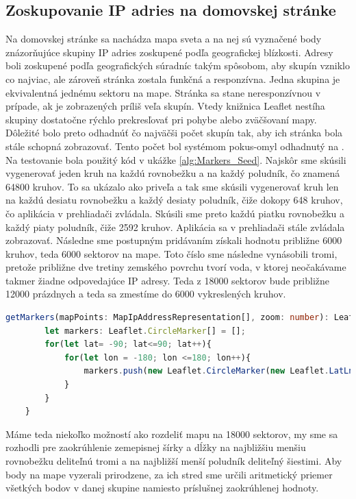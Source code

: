 \subsection{Zoskupovanie IP adries na domovskej stránke}
Na domovskej stránke sa nachádza mapa sveta a na nej sú vyznačené body znázorňujúce skupiny IP adries zoskupené podľa geografickej blízkosti. 
Adresy boli zoskupené podľa geografických súradníc takým spôsobom, aby skupín vzniklo co najviac, ale zároveň stránka zostala funkčná a responzívna. 
Jedna skupina je ekvivalentná jednému sektoru na mape.
Stránka sa stane neresponzívnou v prípade, ak je zobrazených príliš veľa skupín. Vtedy knižnica Leaflet nestíha skupiny dostatočne rýchlo prekresľovať pri 
pohybe alebo zväčšovaní mapy. Dôležité bolo preto odhadnúť čo najväčši počet skupín tak, aby ich stránka bola stále schopná zobrazovať. Tento počet bol 
systémom pokus-omyl odhadnutý na  . Na testovanie bola použitý kód v ukážke \ref{alg:Markers_Seed}. Najskôr sme skúsili vygenerovať jeden kruh na každú rovnobežku 
a na každý poludník, čo znamená 64800 kruhov. To sa ukázalo ako priveľa a tak sme skúsili vygenerovať kruh len na každú desiatu rovnobežku a každý desiaty poludník, 
čiže dokopy 648 kruhov, čo aplikácia v prehliadači zvládala. Skúsili sme preto každú piatku rovnobežku a každý piaty poludník, čiže 2592 kruhov. Aplikácia sa
v prehliadači stále zvládala zobrazovať. Následne sme postupným pridávaním získali hodnotu približne 6000 kruhov, teda 6000 sektorov na mape. Toto číslo sme 
následne vynásobili tromi, pretože približne dve tretiny zemského povrchu tvorí voda, v ktorej neočakávame takmer žiadne odpovedajúce IP adresy. Teda z 18000 
sektorov bude približne 12000 prázdnych a teda sa zmestíme do 6000 vykreslených kruhov. 

\begin{lstlisting}[float,language={TypeScript},caption={Ukážka kódu použitého na testovanie počtu možných skupín},label=alg:Markers_Seed]
    getMarkers(mapPoints: MapIpAddressRepresentation[], zoom: number): Leaflet.CircleMarker[] {
        let markers: Leaflet.CircleMarker[] = [];
        for(let lat= -90; lat<=90; lat++){
            for(let lon = -180; lon <=180; lon++){
                markers.push(new Leaflet.CircleMarker(new Leaflet.LatLng(lat, lon)))
            }
        }
    }
\end{lstlisting}

Máme teda niekoľko možností ako rozdeliť mapu na 18000 sektorov, my sme sa rozhodli pre zaokrúhlenie zemepisnej šírky a dĺžky na najbližšiu menšiu rovnobežku 
deliteľnú tromi a na najbližší menší poludník deliteľný šiestimi. Aby body na mape vyzerali prirodzene, za ich stred sme určili aritmetický priemer všetkých 
bodov v danej skupine namiesto príslušnej zaokrúhlenej hodnoty.

